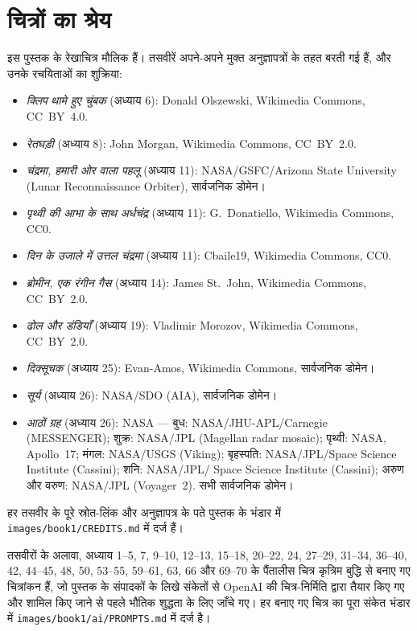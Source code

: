 \chapter*{चित्रों का श्रेय}

इस पुस्तक के रेखाचित्र मौलिक हैं। तसवीरें अपने-अपने मुक्त अनुज्ञापत्रों
के तहत बरती गई हैं, और उनके रचयिताओं का शुक्रिया:

\begin{itemize}
  \item \emph{क्लिप थामे हुए चुंबक} (अध्याय 6): Donald
        Olszewski, Wikimedia Commons, CC~BY~4.0.
  \item \emph{रेतघड़ी} (अध्याय 8): John Morgan, Wikimedia
        Commons, CC~BY~2.0.
  \item \emph{चंद्रमा, हमारी ओर वाला पहलू} (अध्याय 11):
        NASA/GSFC/Arizona State University (Lunar Reconnaissance
        Orbiter), सार्वजनिक डोमेन।
  \item \emph{पृथ्वी की आभा के साथ अर्धचंद्र} (अध्याय 11):
        G.~Donatiello, Wikimedia Commons, CC0.
  \item \emph{दिन के उजाले में उत्तल चंद्रमा} (अध्याय 11): Cbaile19,
        Wikimedia Commons, CC0.
  \item \emph{ब्रोमीन, एक रंगीन गैस} (अध्याय 14): James
        St.~John, Wikimedia Commons, CC~BY~2.0.
  \item \emph{ढोल और डंडियाँ} (अध्याय 19): Vladimir Morozov,
        Wikimedia Commons, CC~BY~2.0.
  \item \emph{दिक्सूचक} (अध्याय 25): Evan-Amos, Wikimedia Commons,
        सार्वजनिक डोमेन।
  \item \emph{सूर्य} (अध्याय 26): NASA/SDO (AIA), सार्वजनिक
        डोमेन।
  \item \emph{आठों ग्रह} (अध्याय 26): NASA ---
        बुध: NASA/\allowbreak JHU-APL/\allowbreak Carnegie
        (MESSENGER); शुक्र: NASA/\allowbreak JPL
        (Magellan radar mosaic); पृथ्वी: NASA, Apollo~17;
        मंगल: NASA/\allowbreak USGS (Viking); बृहस्पति:
        NASA/\allowbreak JPL/\allowbreak Space Science
        Institute (Cassini); शनि: NASA/\allowbreak JPL/\allowbreak
        Space Science Institute (Cassini); अरुण और वरुण:
        NASA/\allowbreak JPL (Voyager~2). सभी सार्वजनिक डोमेन।
\end{itemize}

हर तसवीर के पूरे स्रोत-लिंक और अनुज्ञापत्र के पते पुस्तक के भंडार में
\texttt{images/book1/CREDITS.md} में दर्ज हैं।

\bigskip
तसवीरों के अलावा, अध्याय 1--5, 7, 9--10, 12--13, 15--18, 20--22, 24,
27--29, 31--34, 36--40, 42, 44--45, 48, 50, 53--55, 59--61, 63, 66
और 69--70 के पैंतालीस चित्र कृत्रिम बुद्धि से बनाए गए चित्रांकन हैं,
जो पुस्तक के संपादकों के लिखे संकेतों से OpenAI की चित्र-निर्मिति द्वारा
तैयार किए गए और शामिल किए जाने से पहले भौतिक शुद्धता के लिए जाँचे गए।
हर बनाए गए चित्र का पूरा संकेत भंडार में
\texttt{images/book1/ai/PROMPTS.md} में दर्ज है।
\clearpage
